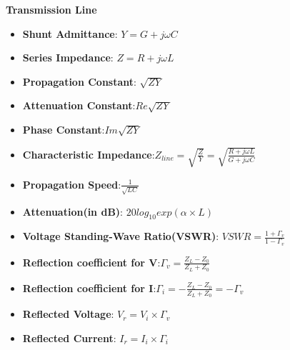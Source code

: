 \documentclass{article}
\begin{document}
  \textbf{Transmission Line}
  \begin{itemize}
  \item \textbf{Shunt Admittance}: $Y = G + j\omega C$
  \item \textbf{Series Impedance}: $Z = R + j \omega L$
  \item \textbf{Propagation Constant}: $ \sqrt{ZY}$
  \item \textbf{Attenuation Constant}:$ Re\sqrt{ZY}$
  \item \textbf{Phase Constant}:$Im\sqrt{ZY} $
  \item \textbf{Characteristic Impedance}:$Z_{line} = \sqrt{\frac{Z}{Y}} = \sqrt{\frac{R + j\omega L}{G + j\omega C}}$
  \item \textbf{Propagation Speed}:$\frac{1}{\sqrt{LC}}$
  \item \textbf{Attenuation(in dB)}: $20log_{10}exp(\alpha \times L)$
  \item \textbf{Voltage Standing-Wave Ratio(VSWR)}: $VSWR = \frac{1+\Gamma_v}{1-\Gamma_v}$
  \item \textbf{Reflection coefficient for V}:$\Gamma_v = \frac{Z_L - Z_0}{Z_L+Z_0}$
  \item \textbf{Reflection coefficient for I}:$\Gamma_i = -\frac{Z_L - Z_0}{Z_L+Z_0} = -\Gamma_v$
  
  \item \textbf{Reflected Voltage}: $V_r = V_i \times \Gamma_v$
  \item \textbf{Reflected Current}: $I_r = I_i \times \Gamma_i$
  \end{itemize}
  
  
\end{document}
